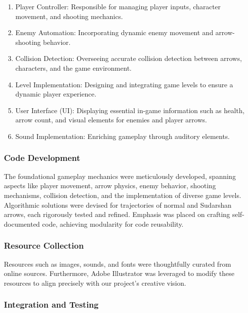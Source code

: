		\begin{enumerate}
			\item Player Controller:
				Responsible for managing player inputs, character movement, and shooting mechanics.
			
			\item Enemy Automation:
				Incorporating dynamic enemy movement and     arrow-shooting behavior.
			
			\item Collision Detection: 
				 Overseeing accurate collision detection between arrows, characters, and the game environment.
				 
			\item Level Implementation:
					Designing and integrating game levels to ensure a dynamic player experience.
			\item User Interface (UI):
					 Displaying essential in-game information such as health, arrow count, and visual elements for enemies and player arrows.
			\item Sound Implementation:
					Enriching gameplay through auditory elements.
			
		\end{enumerate}
		
 \subsubsection{Code Development}
			
			The foundational gameplay mechanics were meticulously developed, spanning aspects like player movement, arrow physics, enemy behavior, shooting mechanisms, collision detection, and the implementation of diverse game levels. Algorithmic solutions were devised for trajectories of normal and Sudarshan arrows, each rigorously tested and refined. Emphasis was placed on crafting self-documented code, achieving modularity for code reusability.
	
	 \subsubsection{Resource Collection}
	
	 		Resources such as images, sounds, and fonts were thoughtfully curated from online sources. Furthermore, Adobe Illustrator was leveraged to modify these resources to align precisely with our project's creative vision.
	 		
	 		
	  \subsubsection{Integration and Testing}
	 
